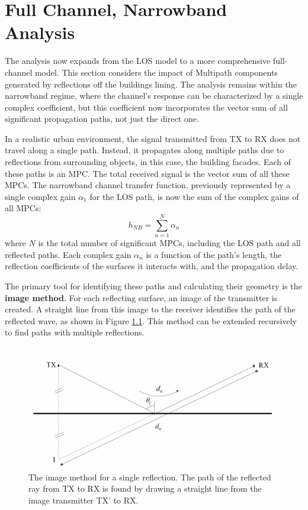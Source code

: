 \chapter{Full Channel, Narrowband Analysis}
\label{chap:full_narrow}

The analysis now expands from the LOS model to a more comprehensive full-channel model. This section considers the impact of Multipath components generated by reflections off the buildings lining. The analysis remains within the narrowband regime, where the channel's response can be characterized by a single complex coefficient, but this coefficient now incorporates the vector sum of all significant propagation paths, not just the direct one.


In a realistic urban environment, the signal transmitted from TX to RX does not travel along a single path. Instead, it propagates along multiple paths due to reflections from surrounding objects, in this case, the building facades. Each of these paths is an MPC. The total received signal is the vector sum of all these MPCs. The narrowband channel transfer function, previously represented by a single complex gain $\alpha_1$ for the LOS path, is now the sum of the complex gains of all MPCs:
\begin{equation}
	h_{NB} = \sum_{n=1}^{N} \alpha_n
\end{equation}
where $N$ is the total number of significant MPCs, including the LOS path and all reflected paths. Each complex gain $\alpha_n$ is a function of the path's length, the reflection coefficients of the surfaces it interacts with, and the propagation delay.

The primary tool for identifying these paths and calculating their geometry is the \textbf{image method}. For each reflecting surface, an image of the transmitter is created. A straight line from this image to the receiver identifies the path of the reflected wave, as shown in Figure \ref{fig:image_method_single}. This method can be extended recursively to find paths with multiple reflections.

\begin{figure}[h!]
	\centering
	\includegraphics[width=0.7\linewidth]{content/4-images/image-method.png}
	\caption{The image method for a single reflection. The path of the reflected ray from TX to RX is found by drawing a straight line from the image transmitter TX' to RX.}
	\label{fig:image_method_single}
\end{figure}


